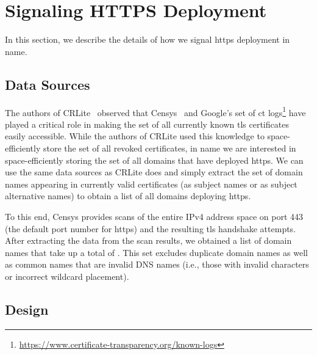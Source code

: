 \section{Signaling HTTPS Deployment}
\label{sec:signaling}

In this section, we describe the details of how we signal \ac{https} deployment
in \ac{name}.

\subsection{Data Sources}

The authors of CRLite~\cite{larisch2017crlite} observed that
Censys~\cite{durumeric2015search} and Google's set of \ac{ct}
logs\footnote{\url{https://www.certificate-transparency.org/known-logs}} have
played a critical role in making the set of all currently known \ac{tls}
certificates easily accessible. While the authors of CRLite used this knowledge
to space-efficiently store the set of all revoked certificates, in \ac{name} we
are interested in space-efficiently storing the set of all domains that have
deployed \ac{https}. We can use the same data sources as CRLite does and simply
extract the set of domain names appearing in currently valid certificates (as
subject names or as subject alternative names) to obtain a list of all domains
deploying \ac{https}.

To this end, Censys provides scans of the entire IPv4 address space on port 443
(the default port number for \ac{https}) and the resulting \ac{tls} handshake
attempts.  After
extracting the data from the  scan results, we obtained a
list of  domain names that take up a total of .
This set excludes duplicate domain names as well as common names that are
invalid DNS names (i.e., those with invalid characters or incorrect wildcard
placement).


\subsection{Design}


